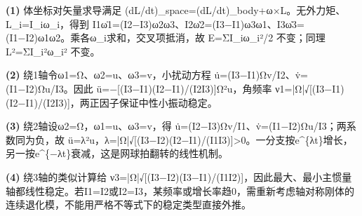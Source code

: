 \par\noindent\textbf{(1)} 体坐标对矢量求导满足 (dL/dt)\_space=(dL/dt)\_body+ω×L。无外力矩、L\_i=I\_iω\_i，得到 I1ω̇1=(I2−I3)ω2ω3、I2ω̇2=(I3−I1)ω3ω1、I3ω̇3=(I1−I2)ω1ω2。乘各ω\_i求和，交叉项抵消，故 E=ΣI\_iω\_i²/2 不变；同理 L²=ΣI\_i²ω\_i² 不变。
\par\noindent\textbf{(2)} 绕1轴令ω1=Ω、ω2=u、ω3=v，小扰动方程 u̇=(I3−I1)Ωv/I2、v̇=(I1−I2)Ωu/I3。因此 ü=−[(I3−I1)(I2−I1)/(I2I3)]Ω²u，角频率 ν1=|Ω|√[(I3−I1)(I2−I1)/(I2I3)]，两正因子保证中性小振动稳定。
\par\noindent\textbf{(3)} 绕2轴设ω2=Ω，ω1=u、ω3=v，得 u̇=(I2−I3)Ωv/I1、v̇=(I1−I2)Ωu/I3；两系数同为负，故 ü=λ²u，λ=|Ω|√[(I3−I2)(I2−I1)/(I1I3)]>0。一分支按e\textasciicircum{}\{λt\}增长，另一按e\textasciicircum{}\{−λt\}衰减，这是网球拍翻转的线性机制。
\par\noindent\textbf{(4)} 绕3轴的类似计算给 ν3=|Ω|√[(I3−I2)(I3−I1)/(I1I2)]，因此最大、最小主惯量轴都线性稳定。若I1=I2或I2=I3，某频率或增长率趋0，需重新考虑轴对称刚体的连续退化模，不能用严格不等式下的稳定类型直接外推。
